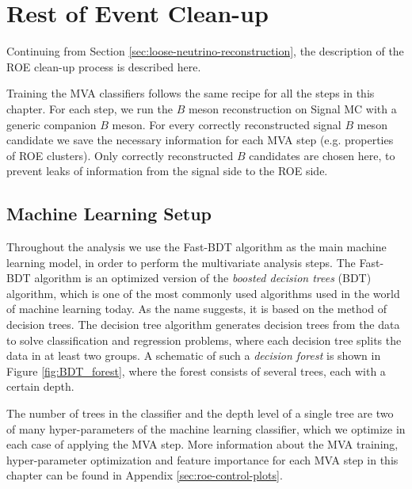 \chapter{Rest of Event Clean-up}
\label{sec:roe}

Continuing from Section \ref{sec:loose-neutrino-reconstruction}, the description of the ROE clean-up process is described here. 

Training the MVA classifiers follows the same recipe for all the steps in this chapter. For each step, we run the $B$ meson reconstruction on Signal MC with a generic companion $B$ meson. For every correctly reconstructed signal $B$ meson candidate we save the necessary information for each MVA step (e.g. properties of ROE clusters). Only correctly reconstructed $B$ candidates are chosen here, to prevent leaks of information from the signal side to the ROE side.


\section{Machine Learning Setup}

Throughout the analysis we use the Fast-BDT algorithm as the main machine learning model, in order to perform the multivariate analysis steps. The Fast-BDT algorithm \cite{Keck2017} is an optimized version of the \textit{boosted decision trees} (BDT) algorithm, which is one of the most commonly used algorithms used in the world of machine learning today. As the name suggests, it is based on the method of decision trees. The decision tree algorithm generates decision trees from the data to solve classification and regression problems, where each decision tree splits the data in at least two groups. A schematic of such a \textit{decision forest} is shown in Figure \ref{fig:BDT_forest}, where the forest consists of several trees, each with a certain depth.

The number of trees in the classifier and the depth level of a single tree are two of many hyper-parameters of the machine learning classifier, which we optimize in each case of applying the MVA step. More information about the MVA training, hyper-parameter optimization and feature importance for each MVA step in this chapter can be found in Appendix \ref{sec:roe-control-plots}.

